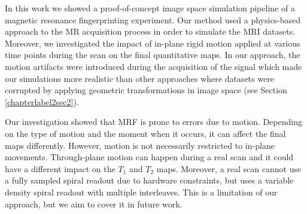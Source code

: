 
In this work we showed a proof-of-concept image space simulation pipeline of a magnetic resonance fingerprinting experiment.
Our method used a physics-based approach to the MR acquisition process in order to simulate the MRI datasets.
Moreover, we investigated the impact of in-plane rigid motion applied at various time points during the scan on the final quantitative maps.
In our approach, the motion artifacts were introduced during the acquisition of the signal which made our simulations more realistic than other approaches where datasets were corrupted by applying geometric transformations in image space (see Section \ref{chapterlabel2sec2}).

\hfill

Our investigation showed that MRF is prone to errors due to motion.
Depending on the type of motion and the moment when it occurs, it can affect the final maps differently.
However, motion is not necessarily restricted to in-plane movements.
Through-plane motion can happen during a real scan and it could have a different impact on the $T_1$ and $T_2$ maps.
Moreover, a real scan cannot use a fully sampled spiral readout due to hardware constraints, but uses a variable density spiral readout with multiple interleaves.
This is a limitation of our approach, but we aim to cover it in future work.